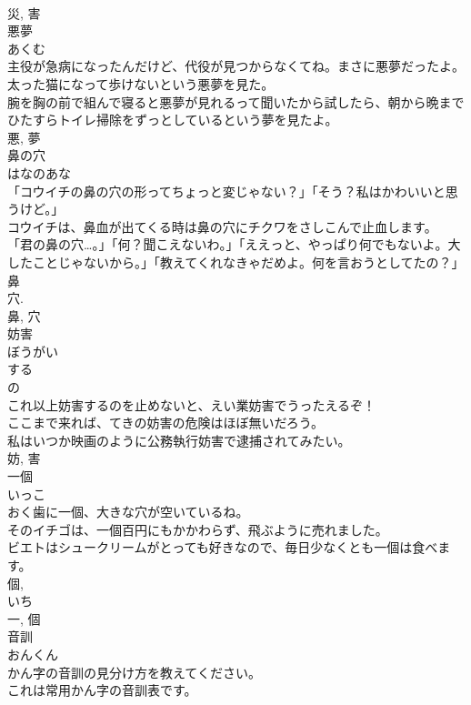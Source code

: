 \documentclass[8pt]{extreport}
\begin{document}
\begin{CJK}{UTF8}{min}
\\	災, 害	
\\	悪夢	
\\	あくむ	
\\	主役が急病になったんだけど、代役が見つからなくてね。まさに悪夢だったよ。	
\\	太った猫になって歩けないという悪夢を見た。	
\\	腕を胸の前で組んで寝ると悪夢が見れるって聞いたから試したら、朝から晩までひたすらトイレ掃除をずっとしているという夢を見たよ。	
\\	悪, 夢	
\\	鼻の穴	
\\	はなのあな	
\\	「コウイチの鼻の穴の形ってちょっと変じゃない？」「そう？私はかわいいと思うけど。」	
\\	コウイチは、鼻血が出てくる時は鼻の穴にチクワをさしこんで止血します。	
\\	「君の鼻の穴…。」「何？聞こえないわ。」「ええっと、やっぱり何でもないよ。大したことじゃないから。」「教えてくれなきゃだめよ。何を言おうとしてたの？」	
\\	鼻 
\\	穴. 
\\	鼻, 穴	
\\	妨害	
\\	ぼうがい	
\\	する 
\\	の 
\\	これ以上妨害するのを止めないと、えい業妨害でうったえるぞ！	
\\	ここまで来れば、てきの妨害の危険はほぼ無いだろう。	
\\	私はいつか映画のように公務執行妨害で逮捕されてみたい。	
\\	妨, 害	
\\	一個	
\\	いっこ	
\\	おく歯に一個、大きな穴が空いているね。	
\\	そのイチゴは、一個百円にもかかわらず、飛ぶように売れました。	
\\	ビエトはシュークリームがとっても好きなので、毎日少なくとも一個は食べます。	
\\	個, 
\\	いち 
\\	一, 個	
\\	音訓	
\\	おんくん	
\\	かん字の音訓の見分け方を教えてください。	
\\	これは常用かん字の音訓表です。	

\end{CJK}
\end{document}
